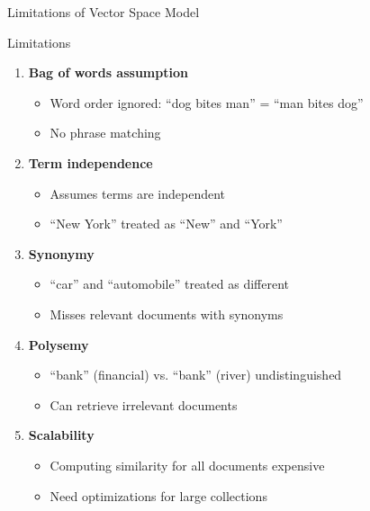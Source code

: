 \documentclass[aspectratio=169]{beamer}
\newif\ifanimated
\newcommand{\cpause}{\ifanimated\pause\fi}
\begin{document}
\begin{frame}[shrink=10]{Limitations of Vector Space Model}
\begin{alertblock}{ Limitations}
\begin{enumerate}
    \item \textbf{Bag of words assumption}
    \begin{itemize}
        \item Word order ignored: ``dog bites man'' = ``man bites dog''
        \item No phrase matching
    \end{itemize}
\cpause
    \item \textbf{Term independence}
    \begin{itemize}
        \item Assumes terms are independent
        \item ``New York'' treated as ``New'' and ``York''
    \end{itemize}
\cpause
    \item \textbf{Synonymy}
    \begin{itemize}
        \item ``car'' and ``automobile'' treated as different
        \item Misses relevant documents with synonyms
    \end{itemize}
\cpause
    \item \textbf{Polysemy}
    \begin{itemize}
        \item ``bank'' (financial) vs. ``bank'' (river) undistinguished
        \item Can retrieve irrelevant documents
    \end{itemize}
\cpause
    \item \textbf{Scalability}
    \begin{itemize}
        \item Computing similarity for all documents expensive
        \item Need optimizations for large collections
    \end{itemize}
\end{enumerate}
\end{alertblock}
\end{frame}
\end{document}
